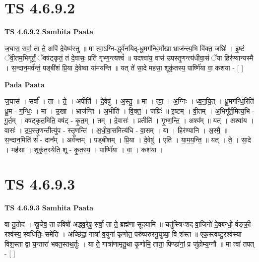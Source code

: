 \documentclass[17pt]{extarticle}
\begin{document}
\section*{ TS 4.6.9.2 }

\textbf{TS 4.6.9.2 } \newline
\textbf{Samhita Paata} \newline

ज॒घास॒ सर्वा॒ ता ते॒ अपि॑ दे॒वेष्व॑स्तु ॥ मा त्वा॒ऽग्नि-र्द्ध्व॑नयिद्-धू॒मग॑न्धि॒र्मोखा भ्राज॑न्त्य॒भि वि॑क्त॒ जघ्रिः॑ । इ॒ष्टं ॅवी॒तम॒भिगू᳚र्तं॒ ॅवष॑ट्कृतं॒ तं दे॒वासः॒ प्रति॑ गृभ्ण॒न्त्यश्वं᳚ ॥ यदश्वा॑य॒ वास॑ उपस्तृ॒णन्त्य॑धीवा॒सं ॅया हिर॑ण्यान्यस्मै । स॒न्दान॒मर्व॑न्तं॒ पड्बी॑शं प्रि॒या दे॒वेष्वा या॑मयन्ति ॥ यत् ते॑ सा॒दे मह॑सा॒ शूकृ॑तस्य॒ पार्ष्णि॑या वा॒ कश॑या - [  ] \newline

\textbf{Pada Paata} \newline

ज॒घास॑ । सर्वा᳚ । ता । ते॒ । अपीति॑ । दे॒वेषु॑ । अ॒स्तु॒ ॥ मा । त्वा॒ । अ॒ग्निः । ध्व॒न॒यि॒त् । धू॒मग॑न्धि॒रिति॑ धू॒म - ग॒न्धिः॒ । मा । उ॒खा । भ्राज॑न्ति । अ॒भीति॑ । वि॒क्त॒ । जघ्रिः॑ ॥ इ॒ष्टम् । वी॒तम् । अ॒भिगू᳚र्त॒मित्य॒भि - गू॒र्त॒म् । वष॑ट्कृत॒मिति॒ वष॑ट् - कृ॒त॒म् । तम् । दे॒वासः॑ । प्रतीति॑ । गृ॒भ्ण॒न्ति॒ । अश्व᳚म् ॥ यत् । अश्वा॑य । वासः॑ । उ॒प॒स्तृ॒णन्तीत्यु॑प - स्तृ॒णन्ति॑ । अ॒धी॒वा॒समित्य॑धि - वा॒सम् । या । हिर॑ण्यानि । अ॒स्मै॒ ॥ स॒न्दान॒मिति॑ सं - दान᳚म् । अर्व॑न्तम् । पड्बी॑शम् । प्रि॒या । दे॒वेषु॑ । एति॑ । या॒म॒य॒न्ति॒ ॥ यत् । ते॒ । सा॒दे । मह॑सा । शूकृ॑त॒स्येति॒ शू - कृ॒त॒स्य॒ । पार्ष्णि॑या । वा॒ । कश॑या ।  \newline




\section*{ TS 4.6.9.3 }

\textbf{TS 4.6.9.3 } \newline
\textbf{Samhita Paata} \newline

वा तु॒तोद॑ । स्रु॒चेव॒ ता ह॒विषो॑ अद्ध्व॒रेषु॒ सर्वा॒ ता ते॒ ब्रह्म॑णा सूदयामि ॥ चतु॑स्त्रिꣳशद्-वा॒जिनो॑ दे॒वब॑न्धो॒-र्वङ्क्री॒-रश्व॑स्य॒ स्वधि॑तिः॒ समे॑ति । अच्छि॑द्रा॒ गात्रा॑ व॒युना॑ कृणोत॒ परु॑ष्परुरनु॒घुष्या॒ वि श॑स्त ॥ एक॒स्त्वष्टु॒रश्व॑स्या विश॒स्ता द्वा य॒न्तारा॑ भवत॒स्तथ॒र्तुः । या ते॒ गात्रा॑णामृतु॒था कृ॒णोमि॒ ताता॒ पिण्डा॑नां॒ प्र जु॑होम्य॒ग्नौ ॥ मा त्वा॑ तपत् - [  ] \newline
\end{document}
